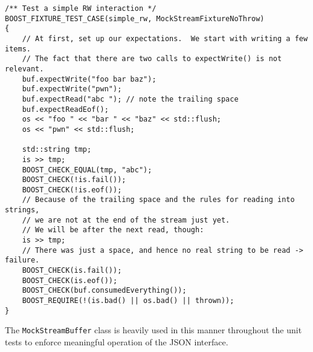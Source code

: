 \documentclass[deska]{subfiles}
\begin{document}
\begin{verbatim}
/** Test a simple RW interaction */
BOOST_FIXTURE_TEST_CASE(simple_rw, MockStreamFixtureNoThrow)
{
    // At first, set up our expectations.  We start with writing a few items.
    // The fact that there are two calls to expectWrite() is not relevant.
    buf.expectWrite("foo bar baz");
    buf.expectWrite("pwn");
    buf.expectRead("abc "); // note the trailing space
    buf.expectReadEof();
    os << "foo " << "bar " << "baz" << std::flush;
    os << "pwn" << std::flush;

    std::string tmp;
    is >> tmp;
    BOOST_CHECK_EQUAL(tmp, "abc");
    BOOST_CHECK(!is.fail());
    BOOST_CHECK(!is.eof());
    // Because of the trailing space and the rules for reading into strings,
    // we are not at the end of the stream just yet.
    // We will be after the next read, though:
    is >> tmp;
    // There was just a space, and hence no real string to be read -> failure.
    BOOST_CHECK(is.fail());
    BOOST_CHECK(is.eof());
    BOOST_CHECK(buf.consumedEverything());
    BOOST_REQUIRE(!(is.bad() || os.bad() || thrown));
}
\end{verbatim}

The {\tt MockStreamBuffer} class is heavily used in this manner throughout the unit tests to enforce meaningful
operation of the JSON interface.
\end{document}
